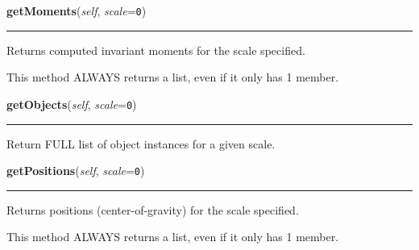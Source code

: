    \label{multireg:objectlist:ObjectList:getMoments}
    \vspace{0.5ex}

    \begin{boxedminipage}{\textwidth}

    \raggedright \textbf{getMoments}(\textit{self}, \textit{scale}=\texttt{0\-})

    \vspace{-1.5ex}

    \rule{\textwidth}{0.5\fboxrule}
    Returns computed invariant moments for the scale specified.

    This method ALWAYS returns a list, even if it only has 1 member.

    \vspace{1ex}

    \end{boxedminipage}

    \label{multireg:objectlist:ObjectList:getObjects}
    \vspace{0.5ex}

    \begin{boxedminipage}{\textwidth}

    \raggedright \textbf{getObjects}(\textit{self}, \textit{scale}=\texttt{0\-})

    \vspace{-1.5ex}

    \rule{\textwidth}{0.5\fboxrule}
    Return FULL list of object instances for a given scale.

    \vspace{1ex}

    \end{boxedminipage}

    \label{multireg:objectlist:ObjectList:getPositions}
    \vspace{0.5ex}

    \begin{boxedminipage}{\textwidth}

    \raggedright \textbf{getPositions}(\textit{self}, \textit{scale}=\texttt{0\-})

    \vspace{-1.5ex}

    \rule{\textwidth}{0.5\fboxrule}
    Returns positions (center-of-gravity) for the scale specified.

    This method ALWAYS returns a list, even if it only has 1 member.

    \vspace{1ex}

    \end{boxedminipage}

